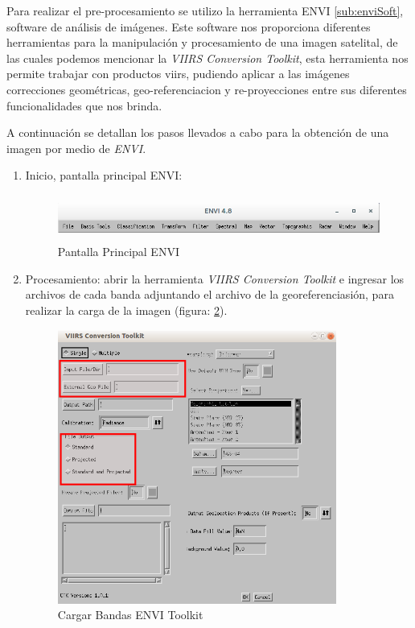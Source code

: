 Para realizar el pre-procesamiento se utilizo la herramienta ENVI \ref{sub:enviSoft}, software de análisis de imágenes. Este software nos proporciona diferentes herramientas para la manipulación y procesamiento  de  una imagen satelital, de las cuales podemos mencionar la \textit{VIIRS Conversion Toolkit}, esta herramienta nos permite trabajar con productos \ac{viirs}, pudiendo aplicar a las imágenes correcciones geométricas, geo-referenciacion y re-proyecciones entre sus diferentes funcionalidades que nos brinda.

A continuación se detallan los pasos llevados a cabo para la obtención de una imagen por medio de  \textit{ENVI}.
\begin{enumerate}
\item Inicio, pantalla principal ENVI:
	\begin{figure}[h]\centering
 		 \includegraphics[height=1.5cm,keepaspectratio=true,clip=true]{imagenes/RecolecciondeDatos/envi1.png}
  			\caption{Pantalla Principal ENVI} \label{Fig: envi1}
	\end{figure}


\item Procesamiento: abrir la herramienta \textit{VIIRS Conversion Toolkit} e ingresar los archivos de cada banda adjuntando el archivo de la georeferenciasión, para realizar la carga de la imagen (figura: \ref{Fig: envi2}).

\begin{figure}[h] \centering
  \includegraphics[height=9cm,keepaspectratio=true,clip=true]{imagenes/RecolecciondeDatos/envi2.png}
  \caption{Cargar Bandas ENVI Toolkit} \label{Fig: envi2}
\end{figure}



\end{enumerate}
